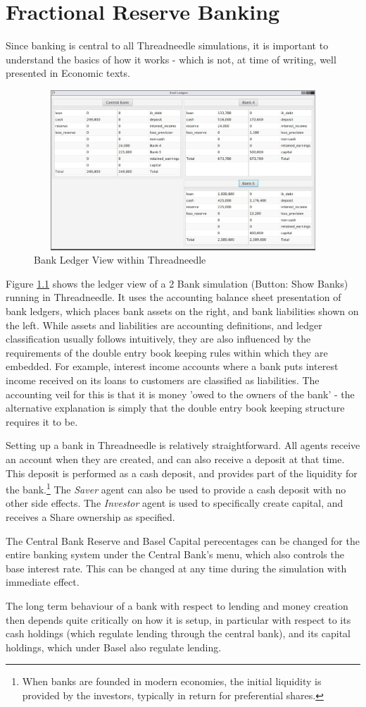 \documentclass[10pt,oneside,openright, a4paper]{memoir}
\begin{document}
\chapter{Fractional Reserve Banking}
Since banking is central to all Threadneedle simulations, it is
important to understand the basics of how it works - which is
not, at time of writing, well presented in Economic texts.
\begin{figure}[ht]
\centering
\includegraphics[width=120mm, height=60mm]{images/fig_bank_ledgers.eps}
\caption{Bank Ledger View within Threadneedle}
\label{fig:ledgerview}
\end{figure}
Figure \ref{fig:ledgerview} shows the ledger view of a 2 Bank 
simulation (Button: Show Banks) running in Threadneedle. It uses 
the accounting balance sheet presentation of bank ledgers, which places
bank assets on the right, and bank liabilities shown on the
left. While assets and liabilities are accounting definitions, 
and ledger classification usually follows intuitively, they are also 
influenced by the requirements of the double entry
book keeping rules within which they are embedded. For example,
interest income accounts
where a bank puts interest income received on its loans to customers
are classified as liabilities. 
The accounting veil for this is that it is money 'owed to 
the owners of the bank' - the alternative explanation is simply
that the double entry book keeping structure requires it to be.
\par
Setting up a bank in Threadneedle is relatively straightforward. 
All agents receive an account when they are created, and can
also receive a deposit at that time. This deposit is performed
as a cash deposit, and provides part of the liquidity for
the bank.\footnote{When banks are founded in modern economies,
the initial liquidity is provided by the investors, typically
in return for preferential shares.} The \emph{Saver} agent
can also be used to provide a cash deposit with no other side
effects.
The \emph{Investor} agent is used to specifically create capital, and
receives a Share ownership as specified. 
\par
The Central Bank Reserve and Basel Capital perecentages can be
changed for the entire banking system under the Central Bank's menu,
which also controls the base interest rate. This can be changed
at any time during the simulation with immediate effect.
\par
The long term behaviour of a bank with respect to lending and money creation
then depends quite critically on how it is setup, in particular
with respect to its cash holdings (which regulate lending
through the central bank), and its capital holdings, which under Basel
also regulate lending.
\end{document}
